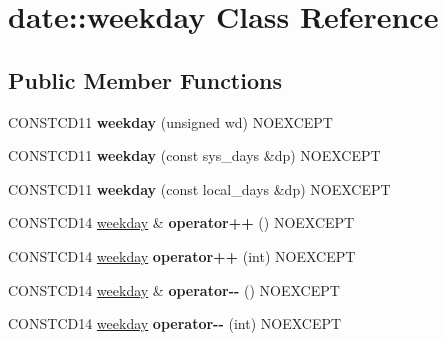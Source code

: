 \hypertarget{classdate_1_1weekday}{}\section{date\+::weekday Class Reference}
\label{classdate_1_1weekday}
\subsection*{Public Member Functions}
\begin{DoxyCompactItemize}
\item 
\mbox{\label{classdate_1_1weekday_a999b4b3d51c862f6bd0068d4907fead0}} 
C\+O\+N\+S\+T\+C\+D11 {\bfseries weekday} (unsigned wd) N\+O\+E\+X\+C\+E\+PT
\item 
\mbox{\label{classdate_1_1weekday_aad8ee1d4429494450b73c4546125bc03}} 
C\+O\+N\+S\+T\+C\+D11 {\bfseries weekday} (const sys\+\_\+days \&dp) N\+O\+E\+X\+C\+E\+PT
\item 
\mbox{\label{classdate_1_1weekday_a06046aa0103044022c1c5c6f88723d60}} 
C\+O\+N\+S\+T\+C\+D11 {\bfseries weekday} (const local\+\_\+days \&dp) N\+O\+E\+X\+C\+E\+PT
\item 
\mbox{\label{classdate_1_1weekday_adb992e4bedbcc92452101e70dcfa7afa}} 
C\+O\+N\+S\+T\+C\+D14 \mbox{\hyperlink{classdate_1_1weekday}{weekday}} \& {\bfseries operator++} () N\+O\+E\+X\+C\+E\+PT
\item 
\mbox{\label{classdate_1_1weekday_a906ef796e520cb2d8059b8b833d5d607}} 
C\+O\+N\+S\+T\+C\+D14 \mbox{\hyperlink{classdate_1_1weekday}{weekday}} {\bfseries operator++} (int) N\+O\+E\+X\+C\+E\+PT
\item 
\mbox{\label{classdate_1_1weekday_a859cb41767bae3d9f77561fbd22563d5}} 
C\+O\+N\+S\+T\+C\+D14 \mbox{\hyperlink{classdate_1_1weekday}{weekday}} \& {\bfseries operator-\/-\/} () N\+O\+E\+X\+C\+E\+PT
\item 
\mbox{\label{classdate_1_1weekday_aa02d2929a27cd3531550f5f46de1c5ba}} 
C\+O\+N\+S\+T\+C\+D14 \mbox{\hyperlink{classdate_1_1weekday}{weekday}} {\bfseries operator-\/-\/} (int) N\+O\+E\+X\+C\+E\+PT

\end{DoxyCompactItemize}
